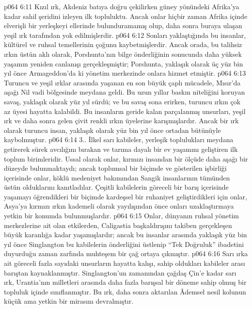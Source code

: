 \vs p064 6:11 Kızıl ırk, Akdeniz batıya doğru çekilirken güney yönündeki Afrika’ya kadar sahil şeridini izleyen ilk topluluktu. Ancak onlar hiçbir zaman Afrika içinde elverişli bir yerleşkeyi ellerinde bulunduramamış olup, daha sonra buraya ulaşan yeşil ırk tarafından yok edilmişlerdir.
\vs p064 6:12 Sonları yaklaştığında bu insanlar, kültürel ve ruhsal temellerinin çoğunu kaybetmişlerdir. Ancak orada, bu talihsiz ırkın üstün aklı olarak, Porshunta’nın bilge önderliğinin sonucunda daha yüksek yaşamın yeniden canlanışı gerçekleşmiştir; Porshunta, yaklaşık olarak üç yüz bin yıl önce Armageddon’da ki yönetim merkezinde onlara hizmet etmiştir.
\vs p064 6:13 Turuncu ve yeşil ırklar arasında yaşanan en son büyük çaplı mücadele, Mısır’da aşağı Nil vadi bölgesinde meydana geldi. Bu uzun yıllar baskın niteliğini koruyan savaş, yaklaşık olarak yüz yıl sürdü; ve bu savaş sona erirken, turuncu ırkın çok az üyesi hayatta kalabildi. Bu insanların geride kalan parçalanmış unsurları, yeşil ırk ve daha sonra gelen çivit renkli ırkın üyelerine karışmışlardır. Ancak bir ırk olarak turuncu insan, yaklaşık olarak yüz bin yıl önce ortadan bütünüyle kaybolmuştur.
\vs p064 6:14 3.\bibnobreakspace {}. İlkel sarı kabileler, yerleşik toplulukları meydana getirerek sürek avcılığını bırakan ve tarıma dayalı bir ev yaşamını geliştiren ilk toplum birimleridir. Ussal olarak onlar, kırmızı insandan bir ölçüde daha aşağı bir düzeyde bulunmaktaydı; ancak toplumsal bir biçimde ve gösterilen işbirliği içerisinde onlar, köklü medeniyet bakımından Sangik insanlarının tümünden üstün olduklarını kanıtladılar. Çeşitli kabilelerin göreceli bir barış içerisinde yaşamayı öğrendikleri bir biçimde kardeşsel bir ruhaniyet geliştirdikleri için onlar, Asya’ya kırmızı ırkın kademeli olarak yayılışından önce onları uzaklaştırmaya yetkin bir konumda bulunmuşlardır.
\vs p064 6:15 Onlar, dünyanın ruhsal yönetim merkezlerine ait olan etkilerden, Caligastia başkaldırışını takiben gerçekleşen büyük karanlığa kadar yaşamışlardır; ancak bu insanlar arasında yaklaşık yüz bin yıl önce Singlangton bu kabilelerin önderliğini üstlenip “Tek Doğruluk” ibadetini duyurduğu zaman zarfında muhteşem bir çağ ortaya çıkmıştır.
\vs p064 6:16 Sarı ırka ait göreceli fazla sayıdaki unsurların hayatta kalışı, sahip oldukları kabileler arası barıştan kaynaklanmıştır. Singlangton’un zamanından çağdaş Çin’e kadar sarı ırk, Urantia’nın milletleri arasında daha fazla barışsal bir döneme sahip olmuş bir topluluk içinde sınıflanmıştır. Bu ırk, daha sonra aktarılan Âdemsel nesil kolunun küçük ama yetkin bir mirasını devralmıştır.
